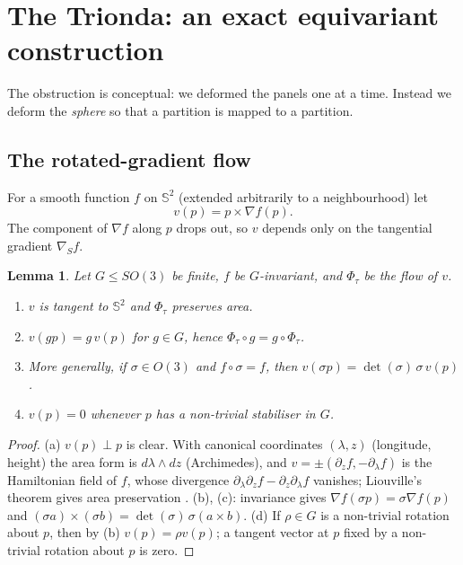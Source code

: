 \documentclass[11pt]{article}
\newtheorem{lemma}[theorem]{Lemma}
\theoremstyle{definition}
\theoremstyle{remark}
\newcommand{\Sph}{\mathbb{S}^2}
\begin{document}
\section{The Trionda: an exact equivariant construction}\label{sec:B}
The obstruction is conceptual: we deformed the panels one at a time. Instead we deform the \emph{sphere} so that a partition is
mapped to a partition.

\subsection{The rotated-gradient flow}
For a smooth function $f$ on $\Sph$ (extended arbitrarily to a neighbourhood) let
\begin{equation}\label{eq:field}
 v(p)=p\times\nabla f(p).
\end{equation}
The component of $\nabla f$ along $p$ drops out, so $v$ depends only on the tangential gradient $\nabla_{\!S}f$.

\begin{lemma}\label{lem:flow}
Let $G\le SO(3)$ be finite, $f$ be $G$-invariant, and $\Phi_\tau$ be the flow of $v$.
\begin{enumerate}
\item[(a)] $v$ is tangent to $\Sph$ and $\Phi_\tau$ preserves area.
\item[(b)] $v(gp)=g\,v(p)$ for $g\in G$, hence $\Phi_\tau\circ g=g\circ\Phi_\tau$.
\item[(c)] More generally, if $\sigma\in O(3)$ and $f\circ\sigma=f$, then $v(\sigma p)=\det(\sigma)\,\sigma\,v(p)$.
\item[(d)] $v(p)=0$ whenever $p$ has a non-trivial stabiliser in $G$.
\end{enumerate}
\end{lemma}
\begin{proof}
(a) $v(p)\perp p$ is clear. With canonical coordinates $(\lambda,z)$ (longitude, height) the area form is $d\lambda\wedge dz$ (Archimedes),
and $v=\pm(\partial_z f,-\partial_\lambda f)$ is the Hamiltonian field of $f$, whose divergence $\partial_\lambda\partial_zf-\partial_z\partial_\lambda f$
vanishes; Liouville's theorem gives area preservation \citep[\S16]{arnold_mechanics}. (b), (c): invariance gives
$\nabla f(\sigma p)=\sigma\nabla f(p)$ and $(\sigma a)\times(\sigma b)=\det(\sigma)\,\sigma(a\times b)$. (d) If $\rho\in G$ is a non-trivial
rotation about $p$, then by (b) $v(p)=\rho v(p)$; a tangent vector at $p$ fixed by a non-trivial rotation about $p$ is zero.
\end{proof}
\end{document}
